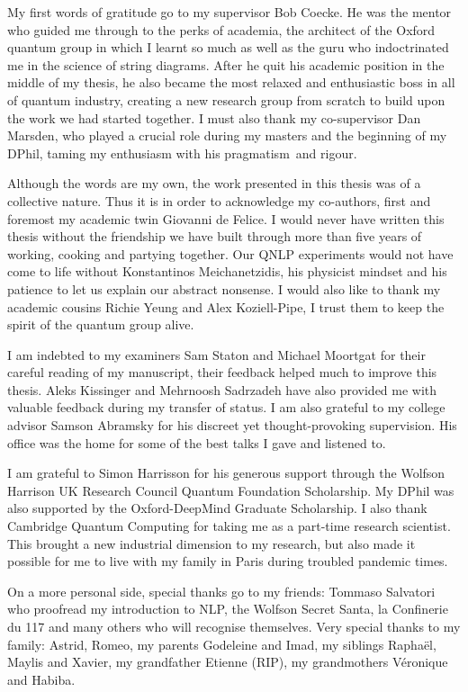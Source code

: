 
\begin{acknowledgements}

My first words of gratitude go to my supervisor Bob Coecke.
He was the mentor who guided me through to the perks of academia, the architect of the Oxford quantum group in which I learnt so much as well as the guru who indoctrinated me in the science of string diagrams.
After he quit his academic position in the middle of my thesis, he also became the most relaxed and enthusiastic boss in all of quantum industry, creating a new research group from scratch to build upon the work we had started together.
I must also thank my co-supervisor Dan Marsden, who played a crucial role during my masters and the beginning of my DPhil, taming my enthusiasm with his pragmatism and rigour.

Although the words are my own, the work presented in this thesis was of a collective nature.
Thus it is in order to acknowledge my co-authors, first and foremost my academic twin Giovanni de Felice.
I would never have written this thesis without the friendship we have built through more than five years of working, cooking and partying together.
Our QNLP experiments would not have come to life without Konstantinos Meichanetzidis, his physicist mindset and his patience to let us explain our abstract nonsense.
I would also like to thank my academic cousins Richie Yeung and Alex Koziell-Pipe, I trust them to keep the spirit of the quantum group alive.

I am indebted to my examiners Sam Staton and Michael Moortgat for their careful reading of my manuscript, their feedback helped much to improve this thesis.
Aleks Kissinger and Mehrnoosh Sadrzadeh have also provided me with valuable feedback during my transfer of status.
I am also grateful to my college advisor Samson Abramsky for his discreet yet thought-provoking supervision.
His office was the home for some of the best talks I gave and listened to.

I am grateful to Simon Harrisson for his generous support through the Wolfson Harrison UK Research Council Quantum Foundation Scholarship.
My DPhil was also supported by the Oxford-DeepMind Graduate Scholarship.
I also thank Cambridge Quantum Computing for taking me as a part-time research scientist.
This brought a new industrial dimension to my research, but also made it possible for me to live with my family in Paris during troubled pandemic times.

On a more personal side, special thanks go to my friends: Tommaso Salvatori who proofread my introduction to NLP, the Wolfson Secret Santa, la Confinerie du 117 and many others who will recognise themselves.
Very special thanks to my family: Astrid, Romeo, my parents Godeleine and Imad, my siblings Raphaël, Maylis and Xavier, my grandfather Etienne (RIP), my grandmothers Véronique and Habiba.
\end{acknowledgements}

